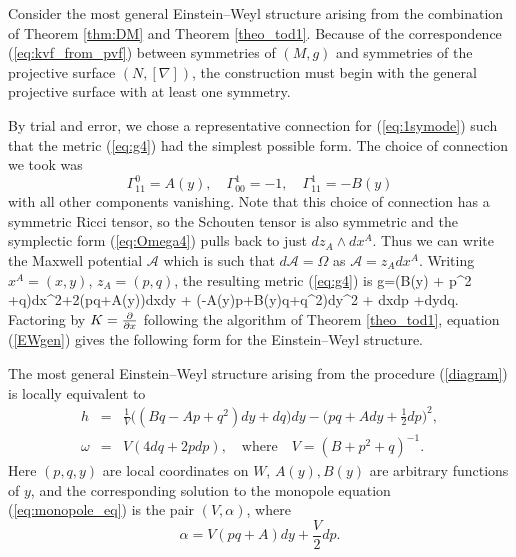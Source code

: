 Consider the most general Einstein--Weyl structure arising from the combination
of Theorem \ref{thm:DM} and Theorem \ref{theo_tod1}. Because of the correspondence (\ref{eq:kvf_from_pvf}) between symmetries of $(M, g)$ and symmetries of the projective surface $(N, [\nabla])$, the construction must begin with the general projective surface with at least one symmetry. 
 
By trial and error, we chose a representative connection for (\ref{eq:1symode}) such that the metric (\ref{eq:g4}) had the simplest possible form. The choice of connection we took was
\[
\Gamma^{0}_{11}=A(y),\quad \Gamma^{1}_{00}=-1, \quad \Gamma^{1}_{11}=-B(y)
\]
with all other components vanishing. Note that this choice of connection has a symmetric Ricci tensor, so the Schouten tensor is also symmetric and the symplectic form (\ref{eq:Omega4}) pulls back to just $dz_A\wedge dx^A$. Thus we can write the Maxwell potential $\mathcal{A}$ which is such that $d\mathcal{A}=\Omega$ as $\mathcal{A}=z_Adx^A$. Writing $x^A=(x,y)$, $z_A=(p,q)$, the resulting metric (\ref{eq:g4}) is
\be
\label{einstein_1}
g=(B(y) + p^2 +q)dx^2+2(pq+A(y))dxdy + (-A(y)p+B(y)q+q^2)dy^2 + dxdp +dydq.
\ee
Factoring by $K=\frac{\partial}{\partial x}$ following the algorithm of Theorem
\ref{theo_tod1}, equation (\ref{EWgen}) gives the following form for the Einstein--Weyl structure.
\begin{prop}
\label{prop1}
The most general  Einstein--Weyl structure arising
from the procedure (\ref{diagram}) is locally equivalent to
\begin{eqnarray}
\label{ew_final}
h&=&\frac{1}{V}\big((Bq -Ap+ q^2)dy+dq\big)dy
-\Big({pq+A}dy+\frac{1}{2}dp\Big)^2, \label{genh} \\
\omega&=&V(4dq+2 pdp), \quad\mbox{where}\quad V=
({B}+ p^2+q)^{-1}.\nonumber
\end{eqnarray}
Here $(p, q, y)$ are local coordinates on $W$, $A(y), B(y)$ are arbitrary functions of $y$, and the corresponding solution to the monopole equation (\ref{eq:monopole_eq}) is the pair $(V,\alpha)$, where
\[
\alpha=V( pq+A)dy+\frac{V}{2}dp.
\]
\end{prop}


